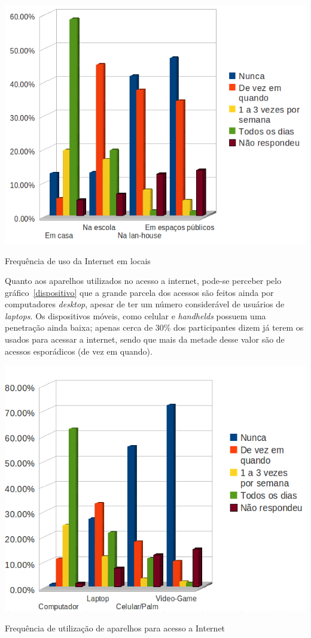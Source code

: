   \begin{grafico}
      \begin{center}
	\includegraphics[width=0.7\linewidth]{arquivos/local.png}
      \end{center}
      \caption{Frequência de uso da Internet em locais}
      \label{local}
  \end{grafico}

  Quanto aos aparelhos utilizados no acesso a internet, pode-se perceber pelo gráfico~\ref{dispositivo} que a grande parcela dos acessos são feitos 
ainda por computadores \textit{desktop}, apesar de ter um número considerável de usuários de \textit{laptops}. Os dispositivos móveis, como celular 
e \textit{handhelds} possuem uma penetração ainda baixa; apenas cerca de 30\% dos participantes dizem já terem os usados para acessar 
a internet, sendo que mais da metade desse valor são de acessos esporádicos (de vez em quando).

  \begin{grafico}
      \begin{center}
	\includegraphics[width=0.7\linewidth]{arquivos/dispositivo.png}
      \end{center}
      \caption{Frequência de utilização de aparelhos para acesso a Internet}
      \label{dispositivo}
  \end{grafico}

